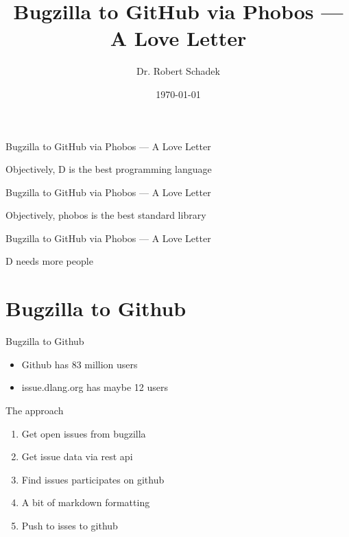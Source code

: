 \documentclass[aspectratio=169,notes]{beamer}
\title{Bugzilla to GitHub via Phobos --- A Love Letter}
\date{\today}
\author{Dr. Robert Schadek}
\begin{document}
	\maketitle

	\begin{frame}[fragile]{Bugzilla to GitHub via Phobos --- A Love Letter}
		\begin{center}
			{\huge Objectively, D is the best programming language}
		\end{center}
	\end{frame}

	\begin{frame}[fragile]{Bugzilla to GitHub via Phobos --- A Love Letter}
		\begin{center}
			{\huge Objectively, phobos is the best standard library}
		\end{center}
	\end{frame}

	\begin{frame}[fragile]{Bugzilla to GitHub via Phobos --- A Love Letter}
		\begin{center}
			{\huge D needs more people}
		\end{center}
	\end{frame}

	\section{Bugzilla to Github}
	\begin{frame}[fragile]{Bugzilla to Github}
		\Large
		\begin{itemize}
			\item Github has 83 million users
			\item issue.dlang.org has maybe 12 users
		\end{itemize}
	\end{frame}

	\begin{frame}[fragile]{The approach}
		\begin{enumerate}
			\item Get open issues from bugzilla
			\item Get issue data via rest api
			\item Find issues participates on github
			\item A bit of markdown formatting
			\item Push to isses to github
		\end{enumerate}
	\end{frame}
\end{document}
